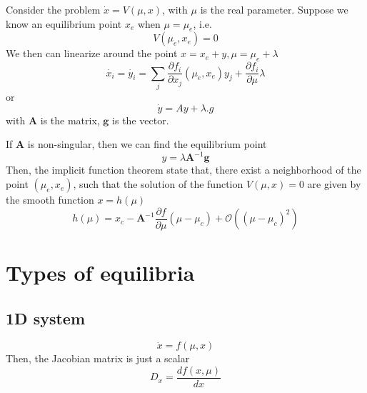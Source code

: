 Consider the problem $\dot{x} = V(\mu,x)$, with $\mu$ is the real
parameter. Suppose we know an equilibrium point $x_e$ when
$\mu=\mu_e$, i.e.
\begin{equation}
  \label{eq:657}
  V(\mu_e,x_e)=0
\end{equation}
We then can linearize around the point $x=x_e+y, \mu=\mu_e+\lambda$
\begin{equation}
  \label{eq:658}
  \dot{x_i} = \dot{y_i} = \sum_j\frac{\partial f_i}{\partial
    x_j}(\mu_e,x_e)y_j + \frac{\partial f_i}{\partial \mu} \lambda 
\end{equation}
or
\begin{equation}
  \label{eq:659}
  \dot{y} = Ay + \lambda .g
\end{equation}
with $\mathbf{A}$ is the matrix, $\mathbf{g}$ is the vector.

If $\mathbf{A}$ is non-singular, then we can find the equilibrium point
\begin{equation}
  \label{eq:660}
  y = \lambda \mathbf{A}^{-1}\mathbf{g}
\end{equation}
Then, the implicit function theorem state that, there exist a
neighborhood of the point $(\mu_e,x_e)$, such that the solution of the
function $V(\mu,x) = 0$ are given by the smooth function $x=h(\mu)$
\begin{equation}
  \label{eq:661}
  h(\mu) = x_c - \mathbf{A}^{-1}\frac{\partial f}{\partial
    \mu}(\mu-\mu_c) + \mathcal{O}((\mu-\mu_c)^2)
\end{equation}

\section{Types of equilibria}
\label{sec:types-equilibria}

\subsection{1D system}
\label{sec:1d-system}

\begin{equation}
  \label{eq:643}
  \dot{x} = f(\mu,x)
\end{equation}
Then, the Jacobian matrix is just a scalar
\begin{equation}
  \label{eq:644}
  D_x = \frac{df(x,\mu)}{dx}
\end{equation}


